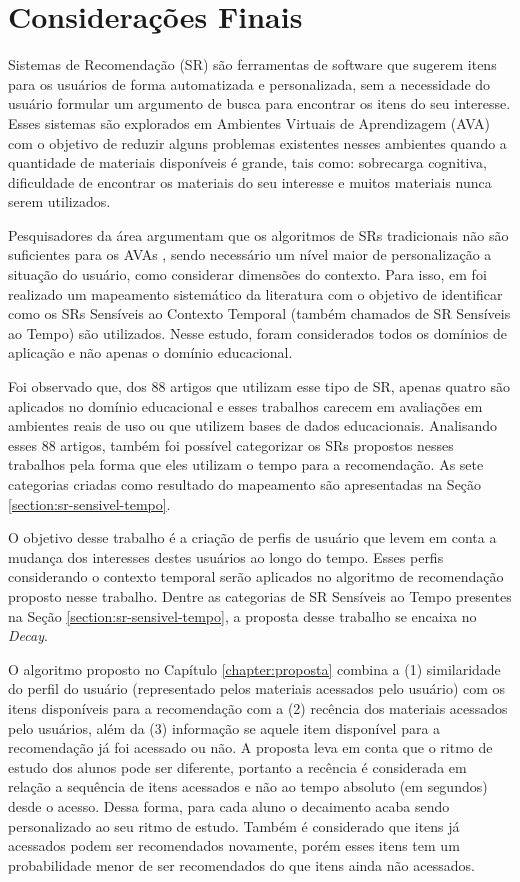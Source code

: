 \chapter{Considerações Finais}\label{chapter:conclusoes}

Sistemas de Recomendação (SR) são ferramentas de software que sugerem itens para os usuários de forma automatizada e personalizada,
sem a necessidade do usuário formular um argumento de busca para encontrar os itens do seu interesse. Esses sistemas são
explorados em Ambientes Virtuais de Aprendizagem (AVA) com o objetivo de reduzir alguns problemas existentes nesses ambientes
quando a quantidade de materiais disponíveis é grande, tais como: sobrecarga cognitiva, dificuldade de encontrar os materiais
do seu interesse e muitos materiais nunca serem utilizados.

Pesquisadores da área argumentam que os algoritmos de SRs tradicionais não são suficientes para os AVAs \cite{verbert2012context, drachsler2015panorama},
sendo necessário um nível maior de personalização a situação do usuário, como considerar dimensões do contexto. Para isso,
em  foi realizado um mapeamento sistemático da literatura com o objetivo de identificar como os SRs Sensíveis
ao Contexto Temporal (também chamados de SR Sensíveis ao Tempo) são utilizados. Nesse estudo, foram considerados todos os domínios
de aplicação e não apenas o domínio educacional.

Foi observado que, dos 88 artigos que utilizam esse tipo de SR, apenas quatro são aplicados no domínio educacional e esses
trabalhos carecem em avaliações em ambientes reais de uso ou que utilizem bases de dados educacionais. Analisando esses
88 artigos, também foi possível categorizar os SRs propostos nesses trabalhos pela forma que eles utilizam o tempo para
a recomendação. As sete categorias criadas como resultado do mapeamento são apresentadas na Seção \ref{section:sr-sensivel-tempo}.

O objetivo desse trabalho é a criação de perfis de usuário que levem em conta a mudança dos interesses destes usuários
ao longo do tempo. Esses perfis considerando o contexto temporal serão aplicados no algoritmo de recomendação proposto nesse
trabalho. Dentre as categorias de SR Sensíveis ao Tempo presentes na Seção \ref{section:sr-sensivel-tempo}, a proposta
desse trabalho se encaixa no \textit{Decay}.

O algoritmo proposto no Capítulo \ref{chapter:proposta} combina a (1) similaridade do perfil do usuário (representado
pelos materiais acessados pelo usuário) com os itens disponíveis para a recomendação com a (2) recência dos materiais
acessados pelo usuários, além da (3) informação se aquele item disponível para a recomendação já foi acessado ou não. A
proposta leva em conta que o ritmo de estudo dos alunos pode ser diferente, portanto a recência é considerada em relação
a sequência de itens acessados e não ao tempo absoluto (em segundos) desde o acesso. Dessa forma, para cada aluno o
decaimento acaba sendo personalizado ao seu ritmo de estudo. Também é considerado que itens já acessados podem ser
recomendados novamente, porém esses itens tem um probabilidade menor de ser recomendados do que itens ainda não acessados.


